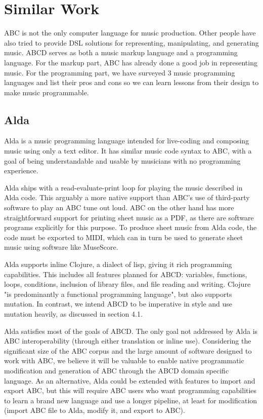 \section{Similar Work}

ABC is not the only computer language for music production. Other people have also tried to provide DSL solutions for representing, manipulating, and generating music. ABCD serves as both a music markup language and a programming language. For the markup part, ABC has already done a good job in representing music. For the programming part, we have surveyed 3 music programming languages and list their pros and cons so we can learn lessons from their design to make music programmable.

\subsection{Alda}

Alda is a music programming language intended for live-coding and composing music using only a text editor. It has similar music code syntax to ABC, with a goal of being understandable and usable by musicians with no programming experience\cite{Yarwood15}. 

Alda ships with a read-evaluate-print loop for playing the music described in Alda code\cite{Yarwood15}. This arguably a more native support than ABC's use of third-party software to play an ABC tune out loud\cite{Walshaw17}. ABC on the other hand has more straightforward support for printing sheet music as a PDF, as there are software programs explicitly for this purpose. To produce sheet music from Alda code, the code must be exported to MIDI\cite{Yarwood15_2}, which can in turn be used to generate sheet music using software like MuseScore\cite{MuseScore17}. 


Alda supports inline Clojure, a dialect of lisp\cite{Hickey17}, giving it rich programming capabilities. This includes all features planned for ABCD: variables, functions, loops, conditions, inclusion of library files, and file reading and writing. Clojure "is predominantly a functional programming language"\cite{Hickey17}, but also supports mutation. In contrast, we intend ABCD to be imperative in style and use mutation heavily, as discussed in section 4.1.

Alda satisfies most of the goals of ABCD. The only goal not addressed by Alda is ABC interoperability (through either translation or inline use). Considering the significant size of the ABC corpus and the large amount of software designed to work with ABC, we believe it will be valuable to enable native programmatic modification and generation of ABC through the ABCD domain specific language. As an alternative, Alda could be extended with features to import and export ABC, but this will require ABC users who want programming capabilities to learn a brand new language and use a longer pipeline, at least for modification (import ABC file to Alda, modify it, and export to ABC).

